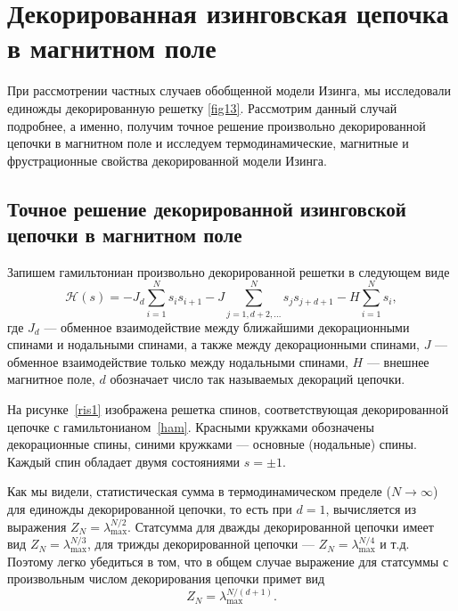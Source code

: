 \chapter{Декорированная изинговская цепочка в магнитном поле}\label{ch:ch3}

При рассмотрении частных случаев обобщенной модели Изинга, мы исследовали единожды декорированную решетку \ref{fig13}. Рассмотрим данный случай подробнее, а именно, получим точное решение произвольно декорированной цепочки в магнитном поле и исследуем термодинамические, магнитные и фрустрационные свойства декорированной модели Изинга. 

\section{Точное решение декорированной изинговской цепочки в магнитном поле}\label{sec:ch3/sect1}

Запишем гамильтониан произвольно декорированной решетки в следующем виде
\begin{equation}
\mathcal{H}(s) = -J_{d}\sum_{i=1}^{N} s_{i} s_{i+1} - J\sum_{j=1,d+2,\dots}^{N} s_{j}s_{j+d+1} - H \sum_{i=1}^{N} s_{i},
\label{ham}
\end{equation}
где $J_d$ --- обменное взаимодействие между ближайшими декорационными спинами и нодальными спинами, а также между декорационными спинами, $J$ --- обменное взаимодействие только между нодальными спинами, $H$ --- внешнее магнитное поле, $d$ обозначает число так называемых \guillemotleft декораций\guillemotright $ $ цепочки.


На рисунке~\ref{ris1} изображена решетка спинов, соответствующая декорированной цепочке с гамильтонианом~\eqref{ham}.
Красными кружками обозначены декорационные спины, синими кружками --- основные (нодальные) спины.
Каждый спин обладает двумя состояниями $s=\pm 1$.

Как мы видели, статистическая сумма в термодинамическом пределе ($N\rightarrow \infty$) для единожды декорированной цепочки, то есть при $d=1$, вычисляется из выражения $Z_{N} = \lambda_{\text{max}}^{N/2}$. Статсумма для дважды декорированной цепочки имеет вид $Z_{N} = \lambda_{\text{max}}^{N/3}$, для трижды декорированной цепочки --- $Z_{N} = \lambda_{\text{max}}^{N/4}$ и  т.д. Поэтому легко убедиться в том, что в общем случае выражение для статсуммы с произвольным числом декорирования цепочки примет вид 
\begin{equation}
Z_{N} = \lambda_{\text{max}}^{N/(d+1)}.
\label{zn}
\end{equation}

